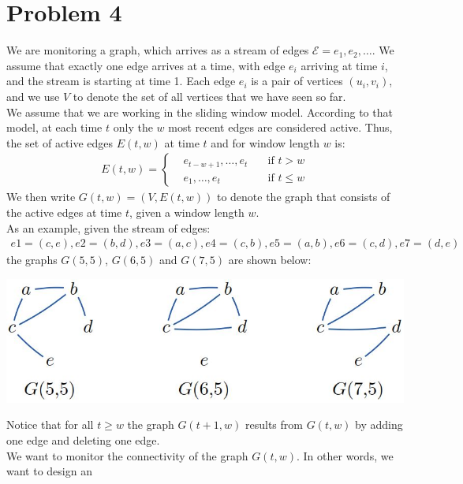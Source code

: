 
\section{Problem 4}

We are monitoring a graph, which arrives as a stream of edges $\mathcal{E} = e_1, e_2, \ldots$. We
assume that exactly one edge arrives at a time, with edge $e_{i}$ arriving at time $i$, and the stream is starting at time 1. Each edge $e_{i}$ is a pair of vertices $(u_{i},v_{i})$, and we use $V$ to denote the set of all vertices that we have seen so far.\\
We assume that we are working in the sliding window model. According to that model, at each
time $t$ only the $w$ most recent edges are considered active. Thus, the set of active edges $E(t,w)$ at time $t$ and for window length $w$ is:
\begin{align*}
E(t,w) = 
	\left\{ \begin{aligned}
		&e_{t-w+1},\ldots,e_t &\quad\text{if }t > w\\
		&e_1,\ldots,e_t &\quad\text{if }t \le  w
	\end{aligned}\right.
\end{align*}
We then write $G(t,w) = (V,E(t,w))$ to denote the graph that consists of the active edges at time $t$, given a window length $w$.\\
As an example, given the stream of edges:
\begin{align*}
	e1 = (c,e), e2 = (b,d), e3 = (a,c), e4 = (c,b), e5 = (a,b), e6 = (c,d), e7 = (d,e)
\end{align*}
the graphs $G(5,5)$, $G(6,5)$ and $G(7,5)$ are shown below:
\begin{center}
	\includegraphics[scale=0.5]{img/example_graphs.jpg}
\end{center}
Notice that for all $t \ge w$ the graph $G(t+1,w)$ results from $G(t,w)$ by adding one edge and deleting one edge.\\
We want to monitor the connectivity of the graph $G(t,w)$. In other words, we want to design an
